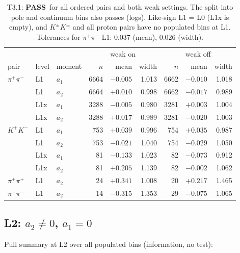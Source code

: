 \documentclass[11pt,a4paper]{article}
\newcommand{\pass}{\textcolor{green!45!black}{\textbf{PASS}}}
\begin{document}
\begin{table}[H]
\centering\small
\begin{tabular}{lllrrrrrr}
\toprule
& & & \multicolumn{3}{c}{weak on} & \multicolumn{3}{c}{weak off} \\
pair & level & moment & $n$ & mean & width & $n$ & mean & width \\
\midrule
$\pi^+\pi^-$ & L1  & $a_1$ & 6664 & $-0.005$ & 1.013 & 6662 & $-0.010$ & 1.018 \\
             & L1  & $a_2$ & 6664 & $+0.010$ & 0.998 & 6662 & $-0.017$ & 0.989 \\
             & L1x & $a_1$ & 3288 & $-0.005$ & 0.980 & 3281 & $+0.003$ & 1.004 \\
             & L1x & $a_2$ & 3288 & $+0.017$ & 0.989 & 3281 & $-0.020$ & 1.003 \\
$K^+K^-$     & L1  & $a_1$ & 753 & $+0.039$ & 0.996 & 754 & $+0.035$ & 0.987 \\
             & L1  & $a_2$ & 753 & $-0.021$ & 1.040 & 754 & $-0.029$ & 1.050 \\
             & L1x & $a_1$ & 81  & $-0.133$ & 1.023 & 82  & $-0.073$ & 0.912 \\
             & L1x & $a_2$ & 81  & $+0.205$ & 1.139 & 82  & $-0.002$ & 1.062 \\
$\pi^+\pi^+$ & L1  & $a_2$ & 24  & $+0.341$ & 1.008 & 20  & $+0.217$ & 1.465 \\
$\pi^-\pi^-$ & L1  & $a_2$ & 14  & $-0.315$ & 1.353 & 29  & $-0.075$ & 1.065 \\
\bottomrule
\end{tabular}
\caption{T3.1: \pass\ for all ordered pairs and both weak settings. The split into pole and
continuum bins also passes (logs). Like-sign L1 = L0 (L1x is empty), and $K^\pm K^\pm$ and all proton
pairs have no populated bins at L1. Tolerances for $\pi^+\pi^-$ L1: 0.037 (mean), 0.026 (width).}
\label{tab:t31}
\end{table}

\subsection{L2: $a_2\neq0$, $a_1=0$}\label{sec:csym}

Pull summary at L2 over all populated bins (information, no test):
\end{document}
